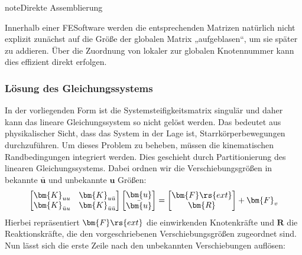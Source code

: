 \documentclass[letterpaper,10pt,german]{jupyterBook}
\begin{document}
\begin{sphinxadmonition}{note}{Direkte Assemblierung}

\sphinxAtStartPar
Innerhalb einer FE\sphinxhyphen{}Software werden die entsprechenden Matrizen natürlich nicht explizit zunächst auf die Größe der globalen Matrix „aufgeblasen“, um sie später zu addieren. Über die Zuordnung von lokaler zur globalen Knotennummer kann dies effizient direkt erfolgen.
\end{sphinxadmonition}




\subsubsection{Lösung des Gleichungssystems}
\label{\detokenize{chapters/chapter2/1dFEM:losung-des-gleichungssystems}}
\sphinxAtStartPar
In der vorliegenden Form ist die Systemsteifigkeitsmatrix singulär und daher kann das lineare Gleichungssystem so nicht gelöst werden. Das bedeutet aus physikalischer Sicht, dass das System in der Lage ist, Starrkörperbewegungen durchzuführen. Um dieses Problem zu beheben, müssen die kinematischen Randbedingungen integriert werden. Dies geschieht durch Partitionierung des linearen Gleichungssystems. Dabei ordnen wir die Verschiebungsgrößen in bekannte \(\bar{\bm{u}}\) und unbekannte \(\bm{u}\) Größen:
\begin{equation}\label{equation:chapters/chapter2/1dFEM:LGSsolve1}
\begin{split}\begin{bmatrix}
\bm{K}_{uu} & \bm{K}_{u\bar{u}} \\
\bm{K}_{\bar{u}u} & \bm{K}_{\bar{u}\bar{u}}
\end{bmatrix}
\begin{bmatrix}
\bm{u} \\
\bar{\bm{u}}
\end{bmatrix} = \begin{bmatrix} \bm{F}\rs{ext} \\ \bm{R} \end{bmatrix} + \bm{F}_v\end{split}
\end{equation}
\sphinxAtStartPar
Hierbei repräsentiert \(\bm{F}\rs{ext}\) die einwirkenden Knotenkräfte und \(\bm{R}\) die Reaktionskräfte, die den vorgeschriebenen Verschiebungsgrößen zugeordnet sind. Nun lässt sich die erste Zeile nach den unbekannten Verschiebungen auflösen:
\end{document}
